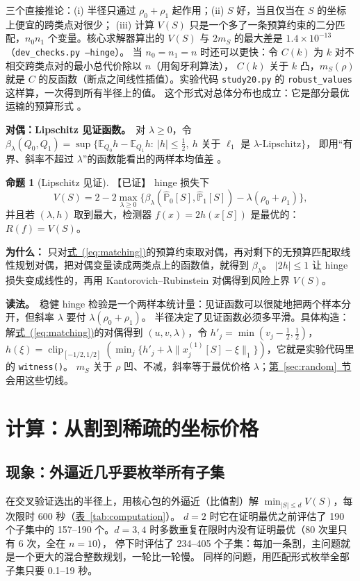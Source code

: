 \documentclass[11pt,a4paper,fontset=none]{ctexart}
\newcommand{\Eqref}[1]{\hyperref[#1]{式~(\ref*{#1})}}
\newcommand{\Secref}[1]{\hyperref[#1]{第~\ref*{#1}~节}}
\newcommand{\Tabref}[1]{\hyperref[#1]{表~\ref*{#1}}}
\theoremstyle{definition}
\newtheorem{proposition}{命题}
\newenvironment{why}{\par\noindent\textbf{为什么：}\ignorespaces}{\par}
\newcommand{\para}[1]{\par\smallskip\noindent\textbf{#1}\ }
\newcommand{\status}[1]{\textrm{【#1】}}
\begin{document}
三个直接推论：(i) 半径只通过 $\rho_0+\rho_1$ 起作用；(ii) $S$ 好，当且仅当在 $S$ 的坐标上便宜的跨类点对很少；
(iii) 计算 $V(S)$ 只是一个多了一条预算约束的二分匹配，$n_0n_1$ 个变量。核心求解器算出的 $V(S)$ 与 $2m_S$ 的最大差是 $1.4\times10^{-13}$（\texttt{dev\_checks.py --hinge}）。
当 $n_0=n_1=n$ 时还可以更快：令 $C(k)$ 为 $k$ 对不相交跨类点对的最小总代价除以 $n$（用匈牙利算法），
$C(k)$ 关于 $k$ 凸，$m_S(\rho)$ 就是 $C$ 的反函数（断点之间线性插值）。实验代码 \texttt{study20.py} 的 \texttt{robust\_values} 这样算，一次得到所有半径上的值。
这个形式对总体分布也成立：它是部分最优运输的预算形式 \cite{figalli2010optimal,chapel2020partial}。

\para{对偶：Lipschitz 见证函数。}对 $\lambda\ge0$，令
$\beta_\lambda(Q_0,Q_1)=\sup\{\mathbb E_{Q_0}h-\mathbb E_{Q_1}h:\ |h|\le\tfrac12,\ h\text{ 关于 }\ell_1\text{ 是 }\lambda\text{-Lipschitz}\}$，
即用“有界、斜率不超过 $\lambda$”的函数能看出的两样本均值差 \cite{dudley2002real}。

\begin{proposition}[Lipschitz 见证]\label{prop:witness}\status{已证}
hinge 损失下
\[
V(S)=2-2\max_{\lambda\ge0}\bigl\{\beta_\lambda(\widehat{\mathbb P}_0[S],\widehat{\mathbb P}_1[S])-\lambda(\rho_0+\rho_1)\bigr\},
\]
并且若 $(\lambda,h)$ 取到最大，检测器 $f(x)=2h(x[S])$ 是最优的：$R(f)=V(S)$。
\end{proposition}
\begin{why}
只对\Eqref{eq:matching}的预算约束取对偶，再对剩下的无预算匹配取线性规划对偶，把对偶变量读成两类点上的函数值，就得到 $\beta_\lambda$。
$|2h|\le1$ 让 hinge 损失变成线性的，再用 Kantorovich--Rubinstein 对偶得到风险上界 $V(S)$。
\end{why}
\para{读法。}稳健 hinge 检验是一个两样本统计量：见证函数可以很陡地把两个样本分开，但斜率 $\lambda$ 要付 $\lambda(\rho_0+\rho_1)$。
半径决定了见证函数必须多平滑。具体构造：解\Eqref{eq:matching}的对偶得到 $(u,v,\lambda)$，令 $h'_j=\min(v_j-\frac12,\frac12)$，
$h(\xi)=\operatorname{clip}_{[-1/2,1/2]}(\min_j\{h'_j+\lambda\|x_j^{(1)}[S]-\xi\|_1\})$，它就是实验代码里的 \texttt{witness()}。
$m_S$ 关于 $\rho$ 凹、不减，斜率等于最优价格 $\lambda$；\Secref{sec:random}会用这些切线。

\section{计算：从割到稀疏的坐标价格}\label{sec:compute}

\subsection{现象：外逼近几乎要枚举所有子集}\label{sec:oa}
在交叉验证选出的半径上，用核心包的外逼近（比值割）解 $\min_{|S|\le d}V(S)$，每次限时 600 秒（\Tabref{tab:computation}）。
$d=2$ 时它在证明最优之前评估了 190 个子集中的 157--190 个。$d=3,4$ 时多数重复在限时内没有证明最优（80 次里只有 6 次，全在 $n=10$），
停下时评估了 234--405 个子集：每加一条割，主问题就是一个更大的混合整数规划，一轮比一轮慢。
同样的问题，用匹配形式枚举全部子集只要 0.1--19 秒。
\end{document}
